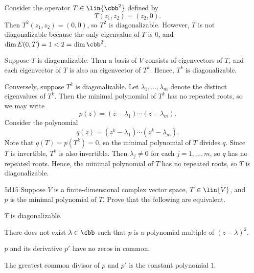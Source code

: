 \begin{solenum}
    \item Consider the operator $T \in \lin{\cbb^2}$ defined by
    \[
        T(z_1, z_2) = (z_2, 0).
    \]
    Then $T^2(z_1, z_2) = (0, 0)$, so $T^2$ is diagonalizable.
    However, $T$ is not diagonalizable because the only eigenvalue of $T$ is $0$, and $\dim E(0, T) = 1 < 2 = \dim \cbb^2$.
    \item Suppose $T$ is diagonalizable.
    Then a basis of $V$ consists of eigenvectors of $T$, and each eigenvector of $T$ is also an eigenvector of $T^k$.
    Hence, $T^k$ is diagonalizable.

    Conversely, suppose $T^k$ is diagonalizable.
    Let $\lambda_1, \ldots, \lambda_m$ denote the distinct eigenvalues of $T^k$.
    Then the minimal polynomial of $T^k$ has no repeated roots, so we may write
    \[
        p(z) = (z - \lambda_1) \cdots (z - \lambda_m).
    \]
    Consider the polynomial
    \[
        q(z) = (z^k - \lambda_1) \cdots (z^k - \lambda_m).
    \]
    Note that $q(T) = p(T^k) = 0$, so the minimal polynomial of $T$ divides $q$.
    Since $T$ is invertible, $T^k$ is also invertible.
    Then $\lambda_j \neq 0$ for each $j = 1, \ldots, m$, so $q$ has no repeated roots.
    Hence, the minimal polynomial of $T$ has no repeated roots, so $T$ is diagonalizable.
\end{solenum}

\begin{exercise}{5d15}
    Suppose $V$ is a finite-dimensional complex vector space, $T \in \lin{V}$, and $p$ is the minimal polynomial of $T$.
    Prove that the following are equivalent.
    \begin{subexercises}
        \item $T$ is diagonalizable.
        \item There does not exist $\lambda \in \cbb$ such that $p$ is a polynomial multiple of $(z - \lambda)^2$.
        \item $p$ and its derivative $p'$ have no zeros in common.
        \item The greatest common divisor of $p$ and $p'$ is the constant polynomial $1$.
    \end{subexercises}

\end{exercise}

